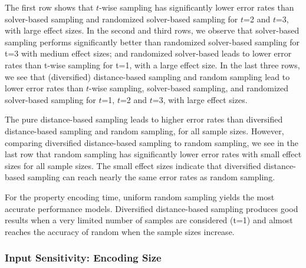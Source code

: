 The first row shows that $t$-wise sampling has significantly lower error rates than solver-based sampling and randomized solver-based sampling for $t$=2 and $t$=3, with large effect sizes.
In the second and third rows, we observe that solver-based sampling performs significantly better than randomized solver-based sampling for t=3 with medium effect sizes; and randomized solver-based leads to lower error rates than t-wise sampling for t=1, with a large effect size.
In the last three rows, we see that (diversified) distance-based sampling and random sampling lead to lower error rates than $t$-wise sampling, solver-based sampling, and randomized solver-based sampling for $t$=1, $t$=2 and $t$=3, with large effect sizes.

The pure distance-based sampling leads to higher error rates than diversified distance-based sampling and random sampling, for all sample sizes.
However, comparing diversified distance-based sampling to random sampling, we see in the last row that random sampling has significantly lower error rates with small effect sizes for all sample sizes.
The small effect sizes indicate that diversified distance-based sampling can reach nearly the same error rates as random sampling. %




\begin{tcolorbox}
For the property encoding time, uniform random sampling yields the most accurate performance models. %
Diversified distance-based sampling produces good results when a very limited number of samples are considered (\ie t=1) and almost reaches the accuracy of random when the sample sizes increase. %
\end{tcolorbox}
\vspace*{-2mm}

%

\subsubsection{Input Sensitivity: Encoding Size}

